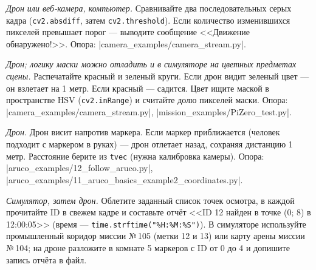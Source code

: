 \begin{taskbox}
\emph{Дрон или веб-камера, компьютер.} Сравнивайте два последовательных серых кадра (\verb|cv2.absdiff|, затем \verb|cv2.threshold|). Если количество изменившихся пикселей превышает порог --- выводите сообщение <<Движение обнаружено!>>.
Опора: \fpath|camera_examples/camera_stream.py|.
\end{taskbox}

\begin{taskbox}
\emph{Дрон; логику маски можно отладить и в симуляторе на цветных предметах сцены.} Распечатайте красный и зеленый круги. Если дрон видит зеленый цвет --- он взлетает на 1 метр. Если красный --- садится. Цвет ищите маской в пространстве HSV (\verb|cv2.inRange|) и считайте долю пикселей маски.
Опора: \fpath|camera_examples/camera_stream.py|, \fpath|mission_examples/PiZero_test.py|.
\end{taskbox}

\begin{taskbox}[(П) Дистанция]
\emph{Дрон.} Дрон висит напротив маркера. Если маркер приближается (человек подходит с маркером в руках) --- дрон отлетает назад, сохраняя дистанцию 1 метр. Расстояние берите из \verb|tvec| (нужна калибровка камеры).
Опора: \fpath|aruco_examples/12_follow_aruco.py|, \fpath|aruco_examples/11_aruco_basics_example2_coordinates.py|.
\end{taskbox}

\begin{taskbox}[(К) Инвентаризация]
\emph{Симулятор, затем дрон.} Облетите заданный список точек осмотра, в каждой прочитайте ID в свежем кадре и составьте отчёт <<ID 12 найден в точке (0; 8) в 12:00:05>> (время --- \verb|time.strftime("%H:%M:%S")|). В симуляторе используйте промышленный коридор миссии №\,105 (метки 12 и 13) или карту арены миссии №\,104; на дроне разложите в комнате 5 маркеров с ID от 0 до 4 и допишите запись отчёта в файл.
\end{taskbox}

